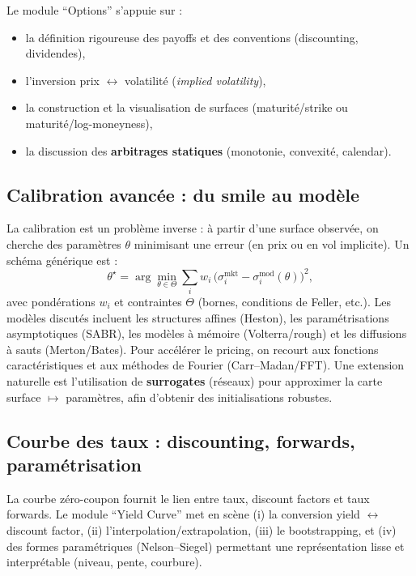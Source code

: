\documentclass[11pt,a4paper]{article}
\newcommand{\1}{\mathbf{1}}
\begin{document}
Le module ``Options'' s'appuie sur :
\begin{itemize}
  \item la d\'efinition rigoureuse des payoffs et des conventions (discounting, dividendes),
  \item l'inversion prix $\leftrightarrow$ volatilit\'e (\emph{implied volatility}),
  \item la construction et la visualisation de surfaces (maturit\'e/strike ou maturit\'e/log-moneyness),
  \item la discussion des \textbf{arbitrages statiques} (monotonie, convexit\'e, calendar).
\end{itemize}

\subsection{Calibration avanc\'ee : du smile au mod\`ele}

La calibration est un probl\`eme inverse : \`a partir d'une surface observ\'ee, on cherche des param\`etres $\theta$
minimisant une erreur (en prix ou en vol implicite). Un sch\'ema g\'en\'erique est :
\[
\theta^\star=\arg\min_{\theta\in\Theta}\sum_{i} w_i\,
\bigl( \sigma^{\text{mkt}}_i-\sigma^{\text{mod}}_i(\theta)\bigr)^2,
\]
avec pond\'erations $w_i$ et contraintes $\Theta$ (bornes, conditions de Feller, etc.).
Les mod\`eles discut\'es incluent les structures affines (Heston), les param\'etrisations asymptotiques (SABR),
les mod\`eles \`a m\'emoire (Volterra/rough) et les diffusions \`a sauts (Merton/Bates). Pour acc\'el\'erer le pricing,
on recourt aux fonctions caract\'eristiques et aux m\'ethodes de Fourier (Carr--Madan/FFT).
Une extension naturelle est l'utilisation de \textbf{surrogates} (r\'eseaux) pour approximer la carte
surface $\mapsto$ param\`etres, afin d'obtenir des initialisations robustes.

\subsection{Courbe des taux : discounting, forwards, param\'etrisation}

La courbe z\'ero-coupon fournit le lien entre taux, discount factors et taux forwards. Le module ``Yield Curve'' met en
sc\`ene (i) la conversion yield $\leftrightarrow$ discount factor, (ii) l'interpolation/extrapolation, (iii) le
bootstrapping, et (iv) des formes param\'etriques (Nelson--Siegel) permettant une repr\'esentation lisse et interpr\'etable
(niveau, pente, courbure).
\end{document}

